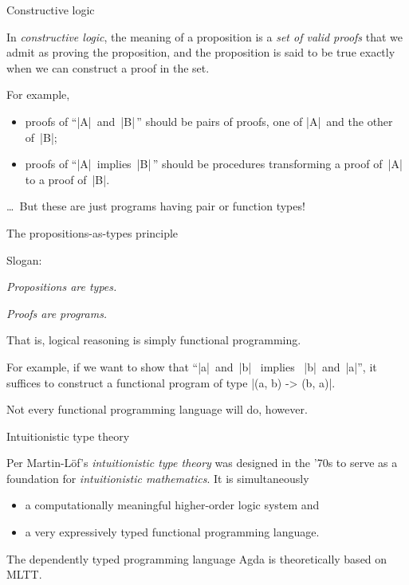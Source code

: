 \documentclass[t,compress,hyperref={hidelinks}]{beamer}
\begin{document}
\begin{frame}{Constructive logic}

In \emph{constructive logic}, the meaning of a proposition is a \emph{set of valid proofs} that we admit as proving the proposition, and the proposition is said to be true exactly when we can construct a proof in the set.

For example,
\begin{itemize}
\item proofs of ``|A|~and~|B|\,'' should be pairs of proofs, one of |A|~and the other of~|B|;
\item proofs of ``|A|~implies~|B|\,'' should be procedures transforming a proof of~|A| to a proof of~|B|.
\end{itemize}

\ldots\ But these are just programs having pair or function types!

\end{frame}

\begin{frame}{The propositions-as-types principle}

Slogan:
\begin{center}
\emph{Propositions are types.}

\emph{Proofs are programs.}
\end{center}

That is, logical reasoning is simply functional programming.

For example, if we want to show that ``|a|~and~|b| ~implies~ |b|~and~|a|'', it suffices to construct a functional program of type |(a, b) -> (b, a)|.

Not every functional programming language will do, however.

\end{frame}

\begin{frame}{Intuitionistic type theory}

Per Martin-Löf's \emph{intuitionistic type theory} was designed in the '70s to serve as a foundation for \emph{intuitionistic mathematics}.
It is simultaneously
\begin{itemize}
\item a computationally meaningful higher-order logic system and
\item a very expressively typed functional programming language.
\end{itemize}

The dependently typed programming language Agda is theoretically based on MLTT.

\end{frame}
\end{document}
